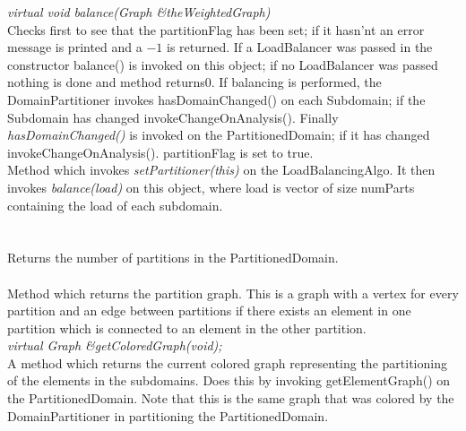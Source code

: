 {\em virtual void balance(Graph \&theWeightedGraph)} \\
Checks first to see that the \p partitionFlag has been set; if it
hasn'nt an error message is printed and a $-1$ is returned. If a
LoadBalancer was passed in the constructor balance() is invoked
on this object; if no LoadBalancer was passed nothing is done and
method returns$0$. If balancing is performed, the DomainPartitioner
invokes hasDomainChanged() on each Subdomain; if the Subdomain
has changed invokeChangeOnAnalysis(). Finally {\em
hasDomainChanged()} is invoked on the PartitionedDomain; if it has
changed invokeChangeOnAnalysis(). \p partitionFlag is set to
true. \\ 

Method which invokes {\em setPartitioner(this)} on the
LoadBalancingAlgo. It then invokes {\em balance(load)} on this
object, where \p load is vector of size \p numParts
containing the load of each subdomain. \\ 

  \\
 \\
Returns the number of partitions in the PartitionedDomain. \\

 \\
Method which returns the partition graph. This is a graph with a
vertex for every partition and an edge between partitions if there
exists an element in one partition which is connected to an element
in the other partition. \\

{\em virtual Graph \&getColoredGraph(void); } \\
A method which returns the current colored graph representing the
partitioning of the elements in the subdomains. Does this by invoking
getElementGraph() on the PartitionedDomain. Note that this is
the same graph that was colored by the DomainPartitioner in
partitioning the PartitionedDomain. \\ 

